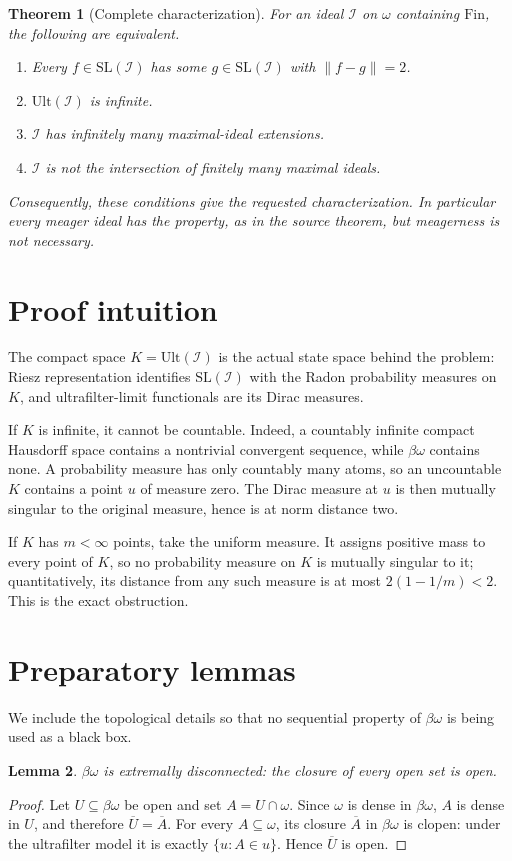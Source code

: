 \documentclass[11pt]{article}
\newtheorem{theorem}{Theorem}
\newtheorem{lemma}[theorem]{Lemma}
\theoremstyle{definition}
\theoremstyle{remark}
\newcommand{\I}{\mathcal I}
\newcommand{\SL}{\mathrm{SL}}
\newcommand{\Ult}{\mathrm{Ult}}
\newcommand{\N}{\omega}
\newcommand{\bN}{\beta\omega}
\begin{document}
\begin{theorem}[Complete characterization]\label{thm:main}
For an ideal $\I$ on $\N$ containing $\mathrm{Fin}$, the following are
equivalent.
\begin{enumerate}
  \item Every $f\in\SL(\I)$ has some $g\in\SL(\I)$ with $\|f-g\|=2$.
  \item $\Ult(\I)$ is infinite.
  \item $\I$ has infinitely many maximal-ideal extensions.
  \item $\I$ is not the intersection of finitely many maximal ideals.
\end{enumerate}
Consequently, these conditions give the requested characterization.  In
particular every meager ideal has the property, as in the source theorem, but
meagerness is not necessary.
\end{theorem}

\section{Proof intuition}

The compact space $K=\Ult(\I)$ is the actual state space behind the problem:
Riesz representation identifies $\SL(\I)$ with the Radon probability measures
on $K$, and ultrafilter-limit functionals are its Dirac measures.

If $K$ is infinite, it cannot be countable.  Indeed, a countably infinite
compact Hausdorff space contains a nontrivial convergent sequence, while
$\bN$ contains none.  A probability measure has only countably many atoms, so
an uncountable $K$ contains a point $u$ of measure zero.  The Dirac measure at
$u$ is then mutually singular to the original measure, hence is at norm
distance two.

If $K$ has $m<\infty$ points, take the uniform measure.  It assigns positive
mass to every point of $K$, so no probability measure on $K$ is mutually
singular to it; quantitatively, its distance from any such measure is at most
$2(1-1/m)<2$.  This is the exact obstruction.

\section{Preparatory lemmas}

We include the topological details so that no sequential property of
$\bN$ is being used as a black box.

\begin{lemma}\label{lem:ed}
$\bN$ is extremally disconnected: the closure of every open set is open.
\end{lemma}
\begin{proof}
Let $U\subseteq\bN$ be open and set $A=U\cap\N$.  Since $\N$ is dense in
$\bN$, $A$ is dense in $U$, and therefore $\overline U=\overline A$.
For every $A\subseteq\N$, its closure $\overline A$ in $\bN$ is clopen: under
the ultrafilter model it is exactly $\{u:A\in u\}$.  Hence $\overline U$ is
open.
\end{proof}
\end{document}
